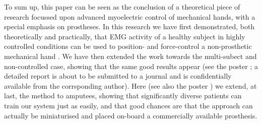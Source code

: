 To sum up, this paper can be seen as the conclusion of a theoretical
piece of research focussed upon advanced myoelectric control of
mechanical hands, with a special emphasis on prostheses. In this
research we have first demonstrated, both theoretically and
practically, that EMG activity of a healthy subject in highly
controlled conditions can be used to position- and force-control a
non-prosthetic mechanical hand \cite{2008.ICRA,2008.BioCyb}. We have
then extended the work towards the multi-subect and non-controlled
case, showing that the same good results appear (see the poster
\cite{2008.GNB}; a detailed report is about to be submitted to a
journal and is confidentially available from the corrsponding
author). Here (see also the poster \cite{2008.Neurorob}) we extend, at
last, the method to amputees, showing that significantly diverse
patients can train our system just as easily, and that good chances
are that the approach can actually be miniaturised and placed on-board
a commercially available prosthesis.
